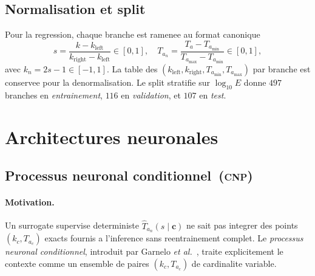 \documentclass[11pt,a4paper]{article}
\newcommand{\Ta}{T_a}
\newcommand{\CNP}{\textsc{cnp}}              %
\begin{document}
\subsection{Normalisation et split}

Pour la regression, chaque branche est ramenee au format
canonique
\begin{equation}
s = \frac{k-k_\text{left}}{k_\text{right}-k_\text{left}}\in[0,1],\quad
\Ta_n = \frac{\Ta-\Ta_\text{min}}{\Ta_\text{max}-\Ta_\text{min}}\in[0,1],
\end{equation}
avec $k_n\!=\!2s\!-\!1\in[-1,1]$. La table des
$(k_\text{left},k_\text{right},\Ta_\text{min},\Ta_\text{max})$ par
branche est conservee pour la denormalisation. Le split stratifie
sur $\log_{10}E$ donne $497$ branches en \emph{entrainement},
$116$ en \emph{validation}, et $107$ en \emph{test}.


\section{Architectures neuronales}
\label{sec:methods}

\subsection{Processus neuronal conditionnel~(\CNP{})}
\label{sec:cnp}

\paragraph{Motivation.} Un surrogate supervise deterministe
$\widehat\Ta_n(s\mid\mathbf{c})$ ne sait pas integrer des points
$(k_c,\Ta_c)$ exacts fournis a l'inference sans reentrainement
complet. Le \emph{processus neuronal conditionnel}, introduit
par Garnelo \emph{et al.}~\cite{garnelo2018cnp}, traite
explicitement le contexte comme un ensemble de paires
$(k_c,\Ta_c)$ de cardinalite variable.
\end{document}
